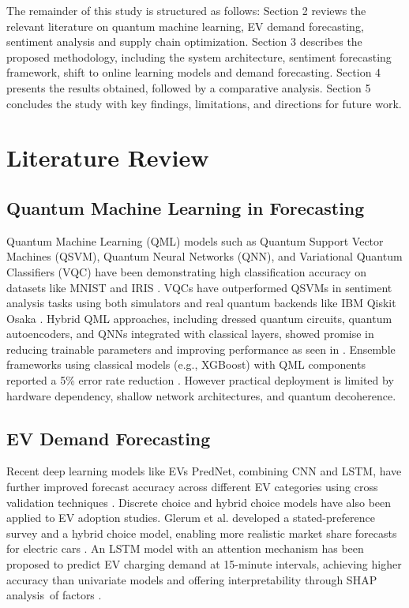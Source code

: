 \documentclass[pdflatex,sn-mathphys-num]{sn-jnl}%
\begin{document}
The remainder of this study is structured as follows: Section 2 reviews the relevant literature on quantum machine learning, EV demand forecasting, sentiment analysis and supply chain optimization. Section 3 describes the proposed methodology, including the system architecture, sentiment forecasting framework, shift to online learning models and demand forecasting. Section 4 presents the results obtained, followed by a comparative analysis. Section 5 concludes the study with key findings, limitations, and directions for future work.


\section{Literature Review}\label{sec2}
\subsection{Quantum Machine Learning in Forecasting }
Quantum Machine Learning (QML) models such as Quantum Support Vector Machines (QSVM), Quantum Neural Networks (QNN), and Variational Quantum Classifiers (VQC) have been demonstrating high classification accuracy on datasets like MNIST and IRIS \cite{bib5}. VQCs have outperformed QSVMs in sentiment analysis tasks using both simulators and real quantum backends like IBM Qiskit Osaka \cite{bib6}. Hybrid QML approaches, including dressed quantum circuits, quantum autoencoders, and QNNs integrated with classical layers, showed promise in reducing trainable parameters and improving performance as seen in \cite{bib7,bib8,bib9}. Ensemble frameworks using classical models (e.g., XGBoost) with QML components reported a 5\% error rate reduction \cite{bib10}. However practical deployment is limited by hardware dependency, shallow network architectures, and quantum decoherence.
\subsection{EV Demand Forecasting}
Recent deep learning models like EVs PredNet, combining CNN and LSTM, have further improved forecast accuracy across different EV categories using cross validation techniques \cite{bib11}.
Discrete choice and hybrid choice models have also been applied to EV adoption studies. Glerum et al. developed a stated-preference survey and a hybrid choice model, enabling more realistic market share forecasts for electric cars \cite{bib22}. An LSTM model with an attention mechanism has been proposed to predict EV charging demand at 15-minute intervals, achieving higher accuracy than univariate models and offering interpretability through SHAP analysis of factors \cite{bib23}.
\end{document}
